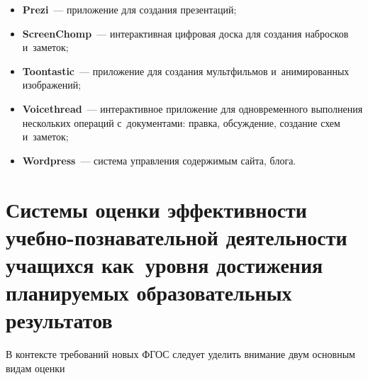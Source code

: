 \begin{multicols}{2}

\begin{itemize}
\item \textbf{Prezi}~--- приложение для создания презентаций;\\[-10pt]
\item \textbf{ScreenChomp}~--- интерактивная цифровая доска для создания набросков и~заметок;\\[-10pt]
\item \textbf{Toontastic}~--- приложение для создания мультфильмов и~анимированных
изображений;\\[-10pt]
\item \textbf{Voicethread}~--- интерактивное приложение для одновременного выполнения
нескольких операций с~документами: правка, обсуждение, создание схем и~заметок;\\[-10pt]
\item \textbf{Wordpress}~--- система управления содержимым сайта, блога.
\vspace*{-9pt}
\end{itemize}

\columnbreak

\section{Системы оценки эффективности учебно-познавательной деятельности
учащихся как~уровня достижения планируемых образовательных результатов}



  В контексте требований новых ФГОС следует уделить внимание двум основным видам
оценки\linebreak\vspace*{-12pt}


\end{multicols}

  \begin{figure} %
    \vspace*{1pt}
 \begin{center}
 \mbox{%
 \epsfxsize=163mm
 }
 \end{center}
 \vspace*{-6pt}
\vspace*{18pt}
   \end{figure}

